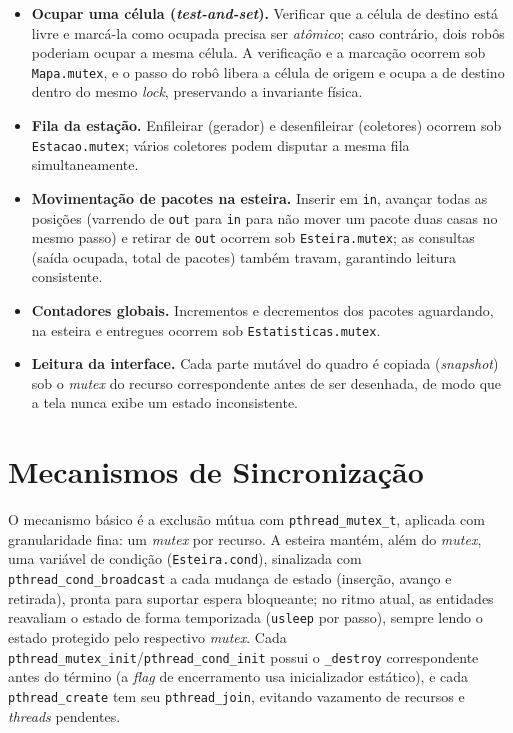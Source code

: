 \documentclass[12pt]{article}
\begin{document}
\begin{itemize}
  \item \textbf{Ocupar uma célula (\textit{test-and-set}).} Verificar que a célula
        de destino está livre e marcá-la como ocupada precisa ser \emph{atômico};
        caso contrário, dois robôs poderiam ocupar a mesma célula. A verificação e
        a marcação ocorrem sob \texttt{Mapa.mutex}, e o passo do robô libera a
        célula de origem e ocupa a de destino dentro do mesmo \textit{lock},
        preservando a invariante física.
  \item \textbf{Fila da estação.} Enfileirar (gerador) e desenfileirar
        (coletores) ocorrem sob \texttt{Estacao.mutex}; vários coletores podem
        disputar a mesma fila simultaneamente.
  \item \textbf{Movimentação de pacotes na esteira.} Inserir em \texttt{in},
        avançar todas as posições (varrendo de \texttt{out} para \texttt{in} para
        não mover um pacote duas casas no mesmo passo) e retirar de \texttt{out}
        ocorrem sob \texttt{Esteira.mutex}; as consultas (saída ocupada, total de
        pacotes) também travam, garantindo leitura consistente.
  \item \textbf{Contadores globais.} Incrementos e decrementos dos pacotes
        aguardando, na esteira e entregues ocorrem sob \texttt{Estatisticas.mutex}.
  \item \textbf{Leitura da interface.} Cada parte mutável do quadro é copiada
        (\textit{snapshot}) sob o \textit{mutex} do recurso correspondente antes de
        ser desenhada, de modo que a tela nunca exibe um estado inconsistente.
\end{itemize}

\section{Mecanismos de Sincronização}

O mecanismo básico é a exclusão mútua com \texttt{pthread\_mutex\_t}, aplicada com
granularidade fina: um \textit{mutex} por recurso. A esteira mantém, além do
\textit{mutex}, uma variável de condição (\texttt{Esteira.cond}), sinalizada com
\texttt{pthread\_cond\_broadcast} a cada mudança de estado (inserção, avanço e
retirada), pronta para suportar espera bloqueante; no ritmo atual, as entidades
reavaliam o estado de forma temporizada (\texttt{usleep} por passo), sempre lendo
o estado protegido pelo respectivo \textit{mutex}. Cada
\texttt{pthread\_mutex\_init}/\texttt{pthread\_cond\_init} possui o
\texttt{\_destroy} correspondente antes do término (a \textit{flag} de encerramento
usa inicializador estático), e cada \texttt{pthread\_create} tem seu
\texttt{pthread\_join}, evitando vazamento de recursos e \textit{threads}
pendentes.
\end{document}
